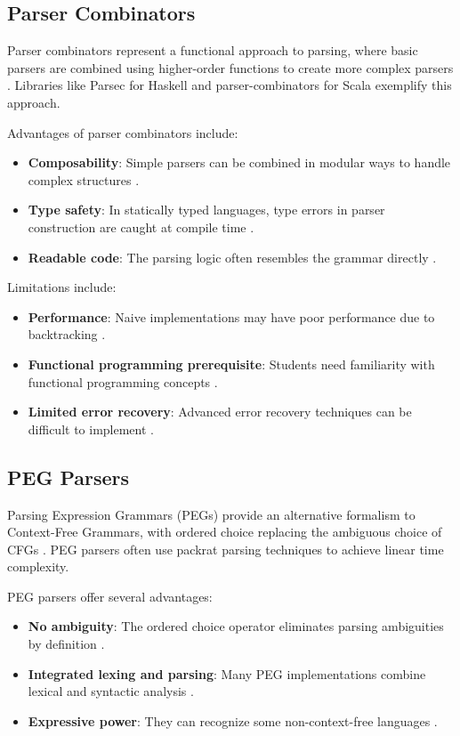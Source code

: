 \subsection{Parser Combinators}

Parser combinators represent a functional approach to parsing, where basic parsers are combined using higher-order functions to create more complex parsers \cite{hutton1992higher}. Libraries like Parsec for Haskell and parser-combinators for Scala exemplify this approach.

Advantages of parser combinators include:
\begin{itemize}
    \item \textbf{Composability}: Simple parsers can be combined in modular ways to handle complex structures \cite{leijen2001parsec}.
    \item \textbf{Type safety}: In statically typed languages, type errors in parser construction are caught at compile time \cite{marlow2011haskell}.
    \item \textbf{Readable code}: The parsing logic often resembles the grammar directly \cite{moors2008parser}.
\end{itemize}

Limitations include:
\begin{itemize}
    \item \textbf{Performance}: Naive implementations may have poor performance due to backtracking \cite{leijen2001parsec}.
    \item \textbf{Functional programming prerequisite}: Students need familiarity with functional programming concepts \cite{sestoft2017programming}.
    \item \textbf{Limited error recovery}: Advanced error recovery techniques can be difficult to implement \cite{tratt2010parsing}.
\end{itemize}

\subsection{PEG Parsers}

Parsing Expression Grammars (PEGs) provide an alternative formalism to Context-Free Grammars, with ordered choice replacing the ambiguous choice of CFGs \cite{ford2004parsing}. PEG parsers often use packrat parsing techniques to achieve linear time complexity.

PEG parsers offer several advantages:
\begin{itemize}
    \item \textbf{No ambiguity}: The ordered choice operator eliminates parsing ambiguities by definition \cite{ford2004parsing}.
    \item \textbf{Integrated lexing and parsing}: Many PEG implementations combine lexical and syntactic analysis \cite{grimm2006better}.
    \item \textbf{Expressive power}: They can recognize some non-context-free languages \cite{medeiros2014peg}.
\end{itemize}

